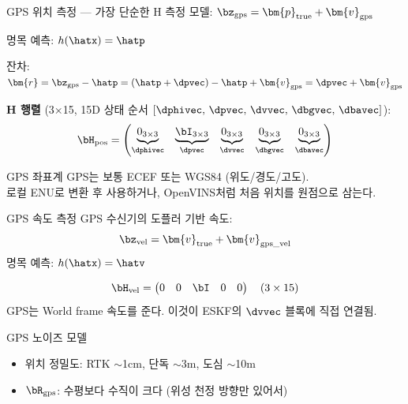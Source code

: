 \begin{frame}{GPS 위치 측정 — 가장 단순한 H}
  측정 모델: $\bz_\text{gps} = \bm{p}_\text{true} + \bm{v}_\text{gps}$

  명목 예측: $h(\hatx) = \hatp$

  잔차: $\bm{r} = \bz_\text{gps} - \hatp = (\hatp + \dpvec) - \hatp + \bm{v}_\text{gps} = \dpvec + \bm{v}_\text{gps}$

  \pause
  \vspace{0.3em}
  \textbf{H 행렬} (3×15, 15D 상태 순서 $[\dphivec,\,\dpvec,\,\dvvec,\,\dbgvec,\,\dbavec]$):
  \[
    \bH_\text{pos} = \begin{pmatrix}
      \underbrace{0_{3\times3}}_{\dphivec} &
      \underbrace{\bI_{3\times3}}_{\dpvec} &
      \underbrace{0_{3\times3}}_{\dvvec} &
      \underbrace{0_{3\times3}}_{\dbgvec} &
      \underbrace{0_{3\times3}}_{\dbavec}
    \end{pmatrix}
  \]
  \pause
  \vspace{0.2em}
  \begin{alertblock}{GPS 좌표계}
    GPS는 보통 ECEF 또는 WGS84 (위도/경도/고도). \\
    로컬 ENU로 변환 후 사용하거나, OpenVINS처럼 처음 위치를 원점으로 삼는다.
  \end{alertblock}
\end{frame}

\begin{frame}{GPS 속도 측정}
  GPS 수신기의 도플러 기반 속도:
  \[
    \bz_\text{vel} = \bm{v}_\text{true} + \bm{v}_\text{gps\_vel}
  \]
  명목 예측: $h(\hatx) = \hatv$

  \[
    \bH_\text{vel} = \begin{pmatrix}
      0 & 0 & \bI & 0 & 0
    \end{pmatrix} \quad (3\times15)
  \]
  \pause
  \vspace{0.3em}
  GPS는 World frame 속도를 준다. 이것이 ESKF의 $\dvvec$ 블록에 직접 연결됨.
  \vspace{0.3em}
  \begin{block}{GPS 노이즈 모델}
    \begin{itemize}
      \item 위치 정밀도: RTK $\sim$1cm, 단독 $\sim$3m, 도심 $\sim$10m
      \item $\bR_\text{gps}$: 수평보다 수직이 크다 (위성 천정 방향만 있어서)
    \end{itemize}
  \end{block}
\end{frame}

